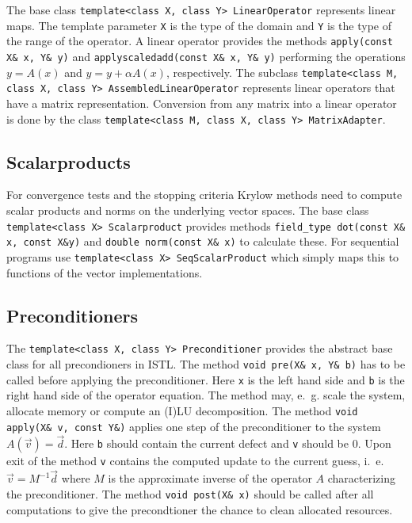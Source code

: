 \documentclass[11pt]{article}
\begin{document}
{\lstset{breaklines=true}
The base class
\lstinline!template<class X, class Y> LinearOperator! represents
linear maps. The 
template parameter \lstinline!X! is the type of the domain and
\lstinline!Y! is the type of the range of the operator.  A linear
operator provides the methods \lstinline!apply(const X& x, Y& y)! and
\lstinline!applyscaledadd(const X& x, Y& y)! performing the
operations $y = A(x)$ and $y = y + \alpha A(x)$, respectively.
The subclass 
\lstinline!template<class M, class X, class Y> AssembledLinearOperator!
represents linear operators that have a matrix
representation. Conversion from any matrix into a linear operator is
done by the class 
\lstinline!template<class M, class X, class Y> MatrixAdapter!.

\subsection{Scalarproducts}
\label{sec:scalarproducts}

For convergence tests and the stopping criteria Krylow methods need to
compute scalar products and norms on the underlying vector spaces. The
base class \lstinline!template<class X> Scalarproduct! provides
methods \lstinline!field_type dot(const X& x, const X&y)! and
\lstinline!double norm(const X& x)! to calculate these. For
sequential programs use 
\lstinline!template<class X> SeqScalarProduct! which simply maps this
to functions of the vector implementations.

\subsection{Preconditioners}
\label{sec:preconditioners}


The \lstinline!template<class X, class Y> Preconditioner! provides the
abstract base class for all precondioners in ISTL. The method
\lstinline!void pre(X& x, Y& b)! has to be called before applying the
preconditioner. Here \lstinline!x! is the left hand side and
\lstinline!b! is the right hand side of the operator equation. The
method may, e.~g. scale the system, allocate memory or compute an (I)LU
decomposition. The method \lstinline!void apply(X& v, const Y&)!
applies one step of the preconditioner to the system $A(\vec v)=\vec d$.
Here \lstinline!b! should contain the current defect and
\lstinline!v! should be $0$. Upon exit of the method \lstinline!v!
contains the computed update to
the current guess, i.~e. $\vec v = M^{-1} \vec
d$ where $M$ is the approximate inverse of the operator $A$
characterizing the preconditioner. The method \lstinline!void post(X& x)!
should be called after all computations to give the precondtioner the
chance to clean allocated resources. 

}
\end{document}
